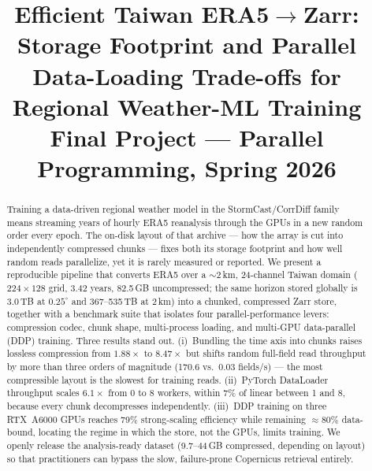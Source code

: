 \documentclass[conference]{IEEEtran}
\newcommand{\cn}[1]{\begin{CJK}{UTF8}{bsmi}##1\end{CJK}}%
\begin{document}
\title{Efficient Taiwan ERA5$\rightarrow$Zarr: Storage Footprint and Parallel
Data-Loading Trade-offs for Regional Weather-ML Training\\
{\footnotesize Final Project --- Parallel Programming, Spring 2026}}

\author{%
\IEEEauthorblockN{\cn{鍾鎮嶸}~(R13944064)\qquad\cn{許博堯}~(B12901026)}
%
}

\maketitle
\thispagestyle{plain}   %
\pagestyle{plain}       %

\begin{abstract}
Training a data-driven regional weather model in the StormCast/CorrDiff family
means streaming years of hourly ERA5 reanalysis through the GPUs in a new
random order every epoch. The on-disk layout of that archive --- how the array
is cut into independently compressed chunks --- fixes both its storage
footprint and how well random reads parallelize, yet it is rarely measured or
reported. We present a reproducible pipeline that converts ERA5 over a
$\sim$2\,km, 24-channel Taiwan domain ($224\times128$ grid, 3.42 years,
82.5\,GB uncompressed; the same horizon stored globally is 3.0\,TB at
$0.25^\circ$ and 367--535\,TB at 2\,km) into a chunked, compressed Zarr store,
together with a benchmark suite that isolates four parallel-performance
levers: compression codec, chunk shape, multi-process loading, and multi-GPU
data-parallel (DDP) training. Three results stand out. (i)~Bundling the time
axis into chunks raises lossless compression from $1.88\times$ to $8.47\times$
but shifts random full-field read throughput by more than three orders of
magnitude (170.6 vs.\ 0.03 fields/s) --- the most compressible layout is the
slowest for training reads. (ii)~PyTorch DataLoader throughput scales
$6.1\times$ from 0 to 8 workers, within 7\% of linear between 1 and 8,
because every chunk decompresses independently. (iii)~DDP training on three
RTX~A6000 GPUs reaches 79\% strong-scaling efficiency while remaining
$\approx$80\% data-bound, locating the regime in which the store, not the
GPUs, limits training. We openly release the analysis-ready dataset
(9.7--44\,GB compressed, depending on layout) so that practitioners can bypass
the slow, failure-prone Copernicus retrieval entirely.
\end{abstract}
\end{document}
